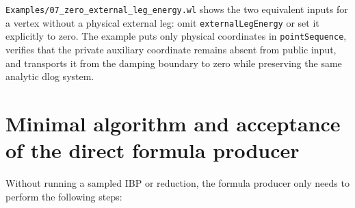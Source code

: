 \documentclass[11pt,a4paper]{article}
\begin{document}
\texttt{Examples/07\_zero\_external\_leg\_energy.wl} shows the two equivalent inputs for a
vertex without a physical external leg: omit \texttt{externalLegEnergy} or set it explicitly to
zero.  The example puts only physical coordinates in \texttt{pointSequence}, verifies that the
private auxiliary coordinate remains absent from public input, and transports it from the damping
boundary to zero while preserving the same analytic dlog system.

\section{Minimal algorithm and acceptance of the direct formula producer}

Without running a sampled IBP or reduction, the formula producer only needs to perform the following steps:
\end{document}
